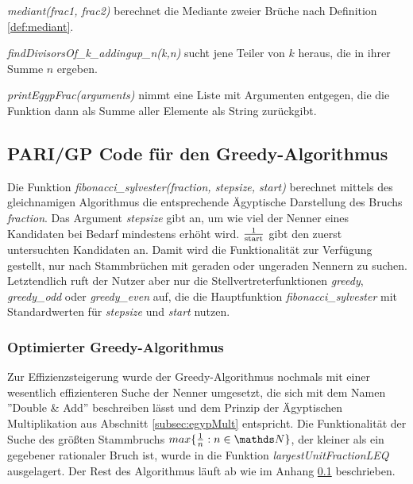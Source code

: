 \emph{mediant(frac1, frac2)} berechnet die Mediante zweier Brüche nach Definition \ref{def:mediant}.


\emph{findDivisorsOf\_k\_addingup\_n(k,n)} sucht jene Teiler von $k$ heraus, die in ihrer Summe $n$ ergeben.


\emph{printEgypFrac(arguments)} nimmt eine Liste mit Argumenten entgegen, die die Funktion dann als Summe aller Elemente als String zurückgibt.



\subsection{PARI/GP Code für den Greedy-Algorithmus}\label{code:greedy}
Die Funktion \emph{fibonacci\_sylvester(fraction, stepsize, start)} berechnet mittels des gleichnamigen Algorithmus die entsprechende Ägyptische Darstellung des Bruchs \emph{fraction}. Das Argument \emph{stepsize} gibt an, um wie viel der Nenner eines Kandidaten bei Bedarf mindestens erhöht wird. $\frac{1}{\text{start}}$ gibt den zuerst untersuchten Kandidaten an. Damit wird die Funktionalität zur Verfügung gestellt, \bspw nur nach Stammbrüchen mit geraden oder ungeraden Nennern zu suchen.\\
Letztendlich ruft der Nutzer aber nur die Stellvertreterfunktionen \emph{greedy}, \emph{greedy\_odd} oder \emph{greedy\_even} auf, die die Hauptfunktion \emph{fibonacci\_sylvester} mit Standardwerten für \emph{stepsize} und \emph{start} nutzen.



\subsubsection{Optimierter Greedy-Algorithmus}\label{code:greedy_fast}
Zur Effizienzsteigerung wurde der Greedy-Algorithmus nochmals mit einer wesentlich effizienteren Suche der Nenner umgesetzt, die sich mit dem Namen ''Double \& Add'' beschreiben lässt und dem Prinzip der Ägyptischen Multiplikation aus Abschnitt \ref{subsec:egypMult} entspricht. Die Funktionalität der Suche des größten Stammbruchs $max\{\uf{n}: n \in \N\}$, der kleiner als ein gegebener rationaler Bruch ist, wurde in die Funktion \emph{largestUnitFractionLEQ} ausgelagert. Der Rest des Algorithmus läuft ab wie im Anhang \ref{code:greedy} beschrieben.



